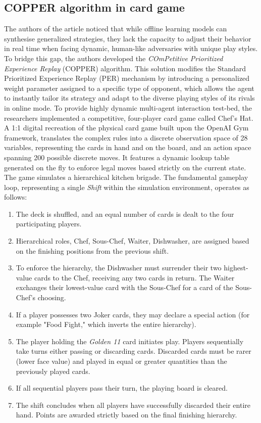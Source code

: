 \subsection{COPPER algorithm in card game}
The authors of the article \cite{BarrosPablo2021YWAo} noticed that while offline learning models can synthesise generalized strategies, they lack the capacity to adjust their behavior in real time when facing dynamic, human-like adversaries with unique play styles. To bridge this gap, the authors developed the \textit{COmPetitive Prioritized Experience Replay }(COPPER) algorithm. This solution modifies the Standard Prioritized Experience Replay (PER) mechanism by introducing a personalized weight parameter assigned to a specific type of opponent, which allows the agent to instantly tailor its strategy and adapt to the diverse playing styles of its rivals in online mode.
 To provide highly dynamic multi-agent interaction test-bed, the researchers implemented a competitive, four-player card game called Chef's Hat.
 A 1:1 digital recreation of the physical card game built upon the OpenAI Gym framework, translates the complex rules into a discrete observation space of 28 variables, representing the cards in hand and on the board, and an action space spanning 200 possible discrete moves. It features a dynamic lookup table generated on the fly to enforce legal moves based strictly on the current state. The game simulates a hierarchical kitchen brigade. The fundamental gameplay loop, representing a single \textit{Shift} within the simulation environment, operates as follows:
 \begin{enumerate}
 	\item The deck is shuffled, and an equal number of cards is dealt to the four participating players.
 	\item Hierarchical roles, Chef, Sous-Chef, Waiter, Dishwasher, are assigned based on the finishing positions from the previous shift.
 	\item To enforce the hierarchy, the Dishwasher must surrender their two highest-value cards to the Chef, receiving any two cards in return. The Waiter exchanges their lowest-value card with the Sous-Chef for a card of the Sous-Chef's choosing.
 	\item  If a player possesses two Joker cards, they may declare a special action (for example "Food Fight," which inverts the entire hierarchy).
 	\item The player holding the \textit{Golden 11} card initiates play. Players sequentially take turns either passing or discarding cards. Discarded cards must be rarer (lower face value) and played in equal or greater quantities than the previously played cards.
 	\item If all sequential players pass their turn, the playing board is cleared.
 	\item The shift concludes when all players have successfully discarded their entire hand. Points are awarded strictly based on the final finishing hierarchy.
 \end{enumerate}
